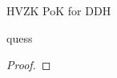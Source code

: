 \begin{solution}{HVZK PoK for DDH}\label{ques:1}
    \begin{question}
    quess
    \end{question}
    \tcblower{}
    \begin{proof}
    \end{proof}
\end{solution}
